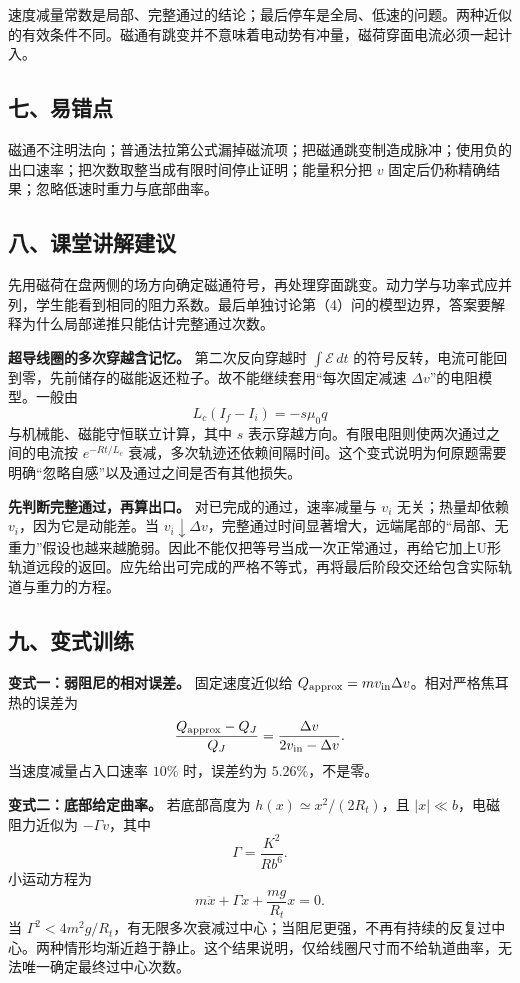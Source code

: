 \documentclass[12pt,a4paper,UTF8]{ctexart}
\begin{document}
速度减量常数是局部、完整通过的结论；最后停车是全局、低速的问题。两种近似的有效条件不同。磁通有跳变并不意味着电动势有冲量，磁荷穿面电流必须一起计入。

\subsection{七、易错点}\label{ux4e03ux6613ux9519ux70b9-2}

磁通不注明法向；普通法拉第公式漏掉磁流项；把磁通跳变制造成脉冲；使用负的出口速率；把次数取整当成有限时间停止证明；能量积分把
\(v\) 固定后仍称精确结果；忽略低速时重力与底部曲率。

\subsection{八、课堂讲解建议}\label{ux516bux8bfeux5802ux8bb2ux89e3ux5efaux8bae-2}

先用磁荷在盘两侧的场方向确定磁通符号，再处理穿面跳变。动力学与功率式应并列，学生能看到相同的阻力系数。最后单独讨论第（4）问的模型边界，答案要解释为什么局部递推只能估计完整通过次数。

\textbf{超导线圈的多次穿越含记忆。} 第二次反向穿越时
\(\int\mathcal E\,dt\)
的符号反转，电流可能回到零，先前储存的磁能返还粒子。故不能继续套用``每次固定减速
\(\Delta v\)''的电阻模型。一般由 \[
L_c(I_f-I_i)=-s\mu_0q
\] 与机械能、磁能守恒联立计算，其中 \(s\)
表示穿越方向。有限电阻则使两次通过之间的电流按 \(e^{-Rt/L_c}\)
衰减，多次轨迹还依赖间隔时间。这个变式说明为何原题需要明确``忽略自感''以及通过之间是否有其他损失。

\textbf{先判断完整通过，再算出口。} 对已完成的通过，速率减量与 \(v_i\)
无关；热量却依赖 \(v_i\)，因为它是动能差。当
\(v_i\downarrow\Delta v\)，完整通过时间显著增大，远端尾部的``局部、无重力''假设也越来越脆弱。因此不能仅把等号当成一次正常通过，再给它加上U形轨道远段的返回。应先给出可完成的严格不等式，再将最后阶段交还给包含实际轨道与重力的方程。

\subsection{九、变式训练}\label{ux4e5dux53d8ux5f0fux8badux7ec3-2}

\textbf{变式一：弱阻尼的相对误差。} 固定速度近似给
\(Q_{\rm approx}=mv_{\rm in}\Delta v\)。相对严格焦耳热的误差为 \[
\frac{Q_{\rm approx}-Q_J}{Q_J}
=\frac{\Delta v}{2v_{\rm in}-\Delta v}.
\] 当速度减量占入口速率 \(10\%\) 时，误差约为 \(5.26\%\)，不是零。

\textbf{变式二：底部给定曲率。} 若底部高度为
\(h(x)\simeq x^2/(2R_t)\)，且 \(|x|\ll b\)，电磁阻力近似为
\(-\Gamma v\)，其中 \[
\Gamma=\frac{K^2}{Rb^6}.
\] 小运动方程为 \[
m\ddot x+\Gamma\dot x+\frac{mg}{R_t}x=0.
\] 当
\(\Gamma^2<4m^2g/R_t\)，有无限多次衰减过中心；当阻尼更强，不再有持续的反复过中心。两种情形均渐近趋于静止。这个结果说明，仅给线圈尺寸而不给轨道曲率，无法唯一确定最终过中心次数。
\end{document}
